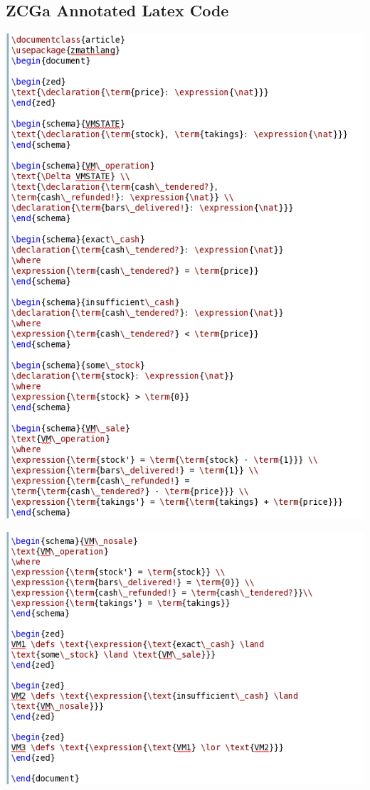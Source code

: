 \subsection{ZCGa Annotated Latex Code}
\label{app:vm1}
\includegraphics[scale=0.5]{examples/vm/1imagea.png}

\noindent \includegraphics[scale=0.5]{examples/vm/1imageb.png}
%
